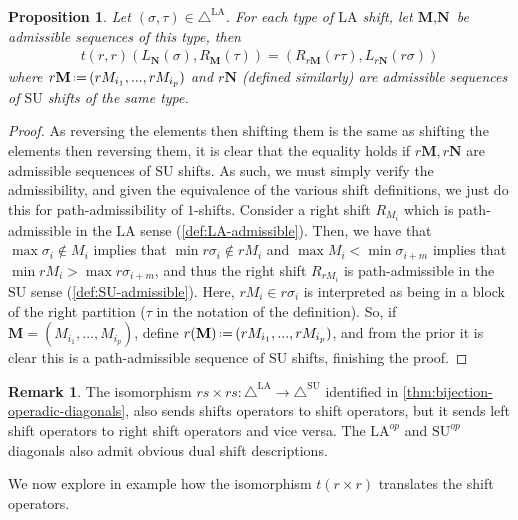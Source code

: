 \documentclass{amsart}
\newtheorem{proposition}[theorem]{Proposition}
\theoremstyle{definition}
\newtheorem{remark}[theorem]{Remark}
\newcommand{\eqdef}{\mbox{\,\raisebox{0.2ex}{\scriptsize\ensuremath{\mathrm:}}\ensuremath{=}\,}} %
\newcommand{\SU}{\mathrm{SU}}
\newcommand{\LA}{\mathrm{LA}}
\newcommand{\SUD}{\triangle^{\mathrm{SU}}}
\newcommand{\LAD}{\triangle^{\mathrm{LA}}}
\begin{document}
\begin{proposition} 
\label{prop:trr is an isomorphism of shifts}
Let $(\sigma,\tau) \in \LAD$.
For each type of $\LA$ shift, let $\textbf{M},\textbf{N}$ be admissible sequences of this type, then 
\begin{align*}
	t(r,r)(L_\mathbf{N}(\sigma), R_\mathbf{M}(\tau)) = (R_{r\mathbf{M}}(r\tau), L_{r\mathbf{N}}(r\sigma))
\end{align*}
where $r\mathbf{M} \eqdef (rM_{i_1},...,rM_{i_p})$ and $r\mathbf{N}$ (defined similarly) are admissible sequences of $\SU$ shifts of the same type.
\end{proposition}
\begin{proof}
As reversing the elements then shifting them is the same as shifting the elements then reversing them,
it is clear that the equality holds if $r\mathbf{M},r\mathbf{N}$ are admissible sequences of $\SU$ shifts.
As such, we must simply verify the admissibility, and given the equivalence of the various shift definitions, we just do this for path-admissibility of $1$-shifts.
Consider a right shift $R_{M_i}$ which is path-admissible in the $\LA$ sense (\cref{def:LA-admissible}). 
Then, we have that $\max \sigma_i \notin M_i$ implies that $ \min r\sigma_i \not \in r M_i$ and $\max M_i < \min \sigma_{i+m}$  implies that $\min r M_i > \max r \sigma_{i+m}$, and thus the right shift $R_{rM_i}$ is path-admissible in the $\SU$ sense (\cref{def:SU-admissible}).
Here, $rM_i \in r\sigma_i$ is interpreted as being in a block of the right partition ($\tau$ in the notation of the definition).
So, if $\mathbf{M} = (M_{i_1},...,M_{i_p})$, define $r(\mathbf{M}) \eqdef (rM_{i_1},...,rM_{i_p})$, and from the prior it is clear this is a path-admissible sequence of $\SU$ shifts, finishing the proof.
\end{proof}

\begin{remark}
The isomorphism $rs\times rs:\LAD \to \SUD$ identified in \cref{thm:bijection-operadic-diagonals}, also sends shifts operators to shift operators, but it sends left shift operators to right shift operators and vice versa.
The $\LA^{op}$ and $\SU^{op}$ diagonals also admit obvious dual shift descriptions.
\end{remark}

We now explore in example how the isomorphism $t(r\times r)$ translates the shift operators.
\end{document}
